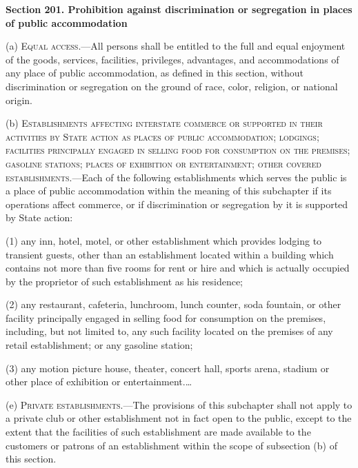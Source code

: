 
\textbf{Section 201.
Prohibition against discrimination or segregation in places of public
accommodation}

(a) \textsc{Equal access}.---All persons shall be entitled to the full and equal
enjoyment of the goods, services, facilities, privileges, advantages, and
accommodations of any place of public accommodation, as defined in this section,
without discrimination or segregation on the ground of race, color, religion, or
national origin.

(b) \textsc{Establishments affecting interstate commerce or supported in their
activities by State action as places of public accommodation; lodgings;
facilities principally engaged in selling food for consumption on the premises;
gasoline stations; places of exhibition or entertainment; other covered
establishments}.---Each of the following establishments which serves the public
is a place of
public accommodation within the meaning of this subchapter if its operations
affect commerce, or if discrimination or segregation by it is supported by
State action:

\begin{statute}
\item (1) any inn, hotel, motel, or other establishment which provides lodging
to transient guests, other than an establishment located within a building which
contains not more than five rooms for rent or hire and which is actually
occupied by the proprietor of such establishment as his residence;

\item (2) any restaurant, cafeteria, lunchroom, lunch counter, soda fountain, or
other facility principally engaged in selling food for consumption on the
premises, including, but not limited to, any such facility located on the
premises of any retail establishment; or any gasoline station;

\item (3) any motion picture house, theater, concert hall, sports arena, stadium
or other place of exhibition or entertainment.\ldots
\end{statute}

(e) \textsc{Private establishments}.---The provisions of this subchapter shall
not apply to a private club or other
establishment not in fact open to the public, except to the extent that the
facilities of such establishment are made available to the customers or patrons
of an establishment within the scope of subsection (b) of this section.





